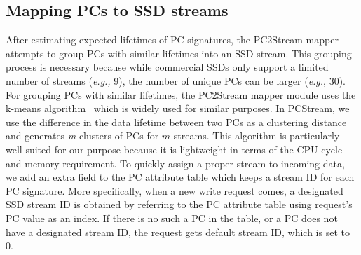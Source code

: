 {%

\subsection{Mapping PCs to SSD streams}

After estimating expected lifetimes of PC signatures, the PC2Stream mapper
attempts to group PCs with similar lifetimes into an SSD stream.  This grouping
process is necessary because while commercial SSDs only support a limited
number of streams ({\it e.g.,} 9), the number of unique PCs can be larger ({\it e.g.},
30).  For grouping PCs with similar lifetimes, the PC2Stream mapper module
uses the k-means algorithm~\cite{kmeans} which is widely used for similar
purposes.  In \textsf{\small PCStream}, we use the difference in the data
lifetime between two PCs as a clustering distance and  generates {\it m}
clusters of PCs for $m$ streams.  This algorithm is particularly well suited
for our purpose because it is lightweight in terms of the CPU cycle and
memory requirement.  To quickly assign a proper stream to incoming data, we add
an extra field to the PC attribute table which keeps a stream ID for each PC
signature.  More specifically, when a new write request comes, a designated SSD
stream ID is obtained by referring to the PC attribute table using request's PC
value as an index.  If there is no such a PC in the table, or a PC does not
have a designated stream ID, the request gets default stream ID, which is set
to 0.

}
